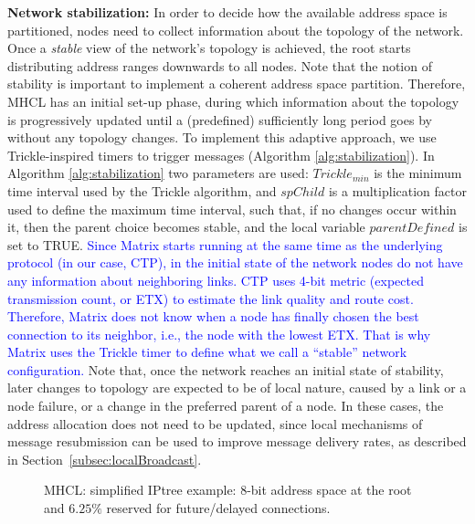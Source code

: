 \textbf{Network stabilization:} In order to decide how the available address space is partitioned, nodes need to collect information about the topology of the network. Once a \textit{stable} view of the network's topology is achieved, the root starts distributing address ranges downwards to all nodes. Note that the notion of stability is important to implement a coherent address space partition. Therefore, MHCL has an initial set-up phase, during which information about the topology is progressively updated until a (predefined) sufficiently long period goes by without any topology changes. To implement this adaptive approach, we use Trickle-inspired timers to trigger messages (Algorithm \ref{alg:stabilization}). In Algorithm \ref{alg:stabilization} two parameters are used: $Trickle_{min}$ is the minimum time interval used by the Trickle algorithm, and $spChild$ is a multiplication factor used to define the maximum time interval, such that, if no changes occur within it, then the parent choice becomes stable, and the local variable $parentDefined$ is set to TRUE.
\textcolor{blue}{Since Matrix starts running at the same time as the underlying protocol (in our case, CTP), in the initial state of the network nodes do not have any information about neighboring links. CTP uses 4-bit metric (expected transmission count, or ETX) to estimate the link quality and route cost. Therefore, Matrix does not know when a node has finally chosen the best connection to its neighbor, i.e., the node with the lowest ETX. That is why Matrix uses the Trickle timer to define what we call a ``stable'' network configuration.}
Note that, once the network reaches an initial state of stability, later changes to topology are expected to be of local nature, caused by a link or a node failure, or a change in the preferred parent of a node. In these cases, the address allocation does not need to be updated, since local mechanisms of message resubmission can be used to improve message delivery rates, as described in Section~\ref{subsec:localBroadcast}.

\begin{figure}[t]
\centering

\caption{MHCL: simplified IPtree example: 8-bit address space at the root and $6.25\%$ reserved for future/delayed connections.}\label{fig:addrPartitionAggregate}
\end{figure}

